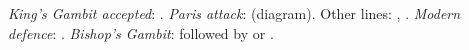 \emph{King's Gambit accepted}: .
\emph{Paris attack}:  (diagram).
Other lines: , .
\emph{Modern defence}: .
\emph{Bishop's Gambit}:  followed by  or .
